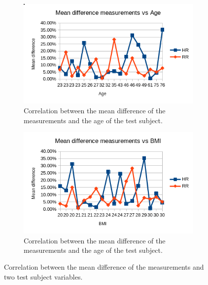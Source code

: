 \begin{figure}[t]
\centering
\begin{subfigure}{.45\textwidth}
  \centering
  \includegraphics[width=\linewidth]{figures/validation/age_correlation.png}  
  \caption{Correlation between the mean difference of the measurements and the age of the test subject.}
  \label{fig:age_corr}
\end{subfigure}
\begin{subfigure}{.45\textwidth}
  \centering
  \includegraphics[width=\linewidth]{figures/validation/bmi_correlation.png}  
  \caption{Correlation between the mean difference of the measurements and the age of the test subject.}
  \label{fig:bmi_corr}
\end{subfigure}
\caption{Correlation between the mean difference of the measurements and two test subject variables.}
\label{fig:age_bmi_corr}
\end{figure}

